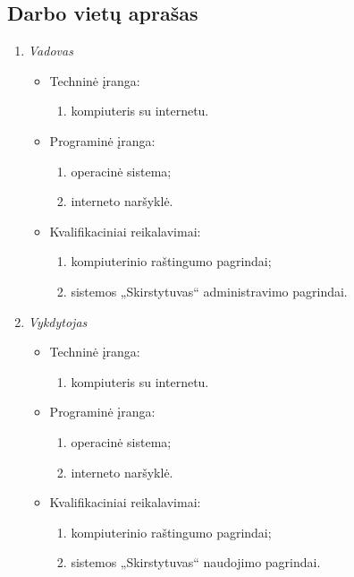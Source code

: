 \subsection{Darbo vietų aprašas}
\begin{enumerate}
  \item \emph{Vadovas}
	\begin{itemize}
	  \item Techninė įranga:
		\begin{enumerate}
			\item kompiuteris su internetu.
		\end{enumerate}
	  \item Programinė įranga:
		\begin{enumerate}
			\item operacinė sistema;
      \item interneto naršyklė.
		\end{enumerate}
	  \item Kvalifikaciniai reikalavimai:
		\begin{enumerate}
			\item kompiuterinio raštingumo pagrindai;
			\item sistemos „Skirstytuvas“ administravimo pagrindai.
		\end{enumerate}
	\end{itemize}

  \item \emph{Vykdytojas}
	\begin{itemize}
	  \item Techninė įranga:
		\begin{enumerate}
			\item kompiuteris su internetu.
		\end{enumerate}
	  \item Programinė įranga:
		\begin{enumerate}
			\item operacinė sistema;
      \item interneto naršyklė.
		\end{enumerate}
	  \item Kvalifikaciniai reikalavimai:
		\begin{enumerate}
			\item kompiuterinio raštingumo pagrindai;
			\item sistemos „Skirstytuvas“ naudojimo pagrindai.
		\end{enumerate}
	\end{itemize}
\end{enumerate}

